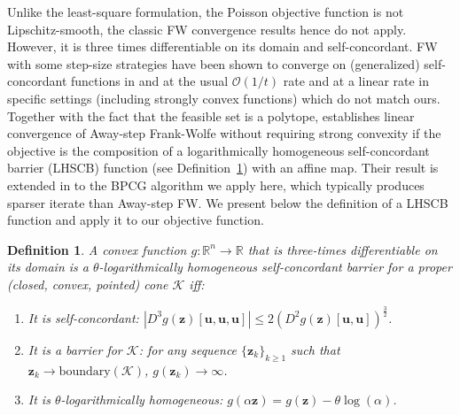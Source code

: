 \documentclass{ecai}
\newtheorem{definition}{Definition}
\newcommand{\vu}{\mathbf{u}}
\newcommand{\vz}{\mathbf{z}}
\newcommand{\R}{\mathbb{R}}
\begin{document}
Unlike the least-square formulation, the Poisson objective function is not Lipschitz-smooth, the classic FW convergence results hence do not apply.
However, it is three times differentiable on its domain and self-concordant.
FW with some step-size strategies have been shown to converge on (generalized) self-concordant functions in \cite{dvurechensky2023generalized} and \cite{carderera2024scalable} at the usual $\mathcal{O}(1/t)$ rate and at a linear rate in specific settings (including strongly convex functions) which do not match ours.
Together with the fact that the feasible set is a polytope, \cite{zhao2025new} establishes linear convergence of Away-step Frank-Wolfe without requiring strong convexity if the objective is the composition of a logarithmically homogeneous self-concordant barrier (LHSCB) function (see Definition~\ref{def:logbarrier}) with an affine map.
Their result is extended in \cite{hendrych2023solving} to the BPCG algorithm we apply here, which typically produces sparser iterate than Away-step FW.
We present below the definition of a LHSCB function and apply it to our objective function.
\begin{definition}\label{def:logbarrier}
A convex function $g: \R^n \rightarrow \R$ that is three-times differentiable on its domain is a $\theta$-logarithmically homogeneous self-concordant barrier for a proper (closed, convex, pointed) cone $\mathcal{K}$ iff:
\begin{enumerate}
\item It is self-concordant: $|D^3g(\vz)[\vu,\vu,\vu] | \leq 2 (D^2 g(\vz)[\vu,\vu])^{\frac32}$.
\item It is a barrier for $\mathcal K$: for any sequence $\{\vz_k\}_{k \geq 1}$ such that $\vz_k \rightarrow \mathrm{boundary}(\mathcal K)$, $g(\vz_k) \rightarrow \infty$.
\item It is $\theta$-logarithmically homogeneous: $g(\alpha \vz) = g(\vz) - \theta \log(\alpha)$.
\end{enumerate}
\end{definition}
\end{document}
